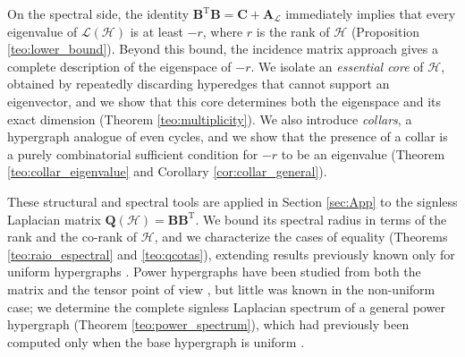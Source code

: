 \documentclass[12pt,reqno]{amsart}
\begin{document}
On the spectral side, the identity $\mathbf{B}^\mathrm{T}\mathbf{B} = \mathbf{C} + \mathbf{A}_{\mathcal{L}}$ immediately implies that every eigenvalue of $\mathcal{L}(\mathcal{H})$ is at least $-r$, where $r$ is the rank of $\mathcal{H}$ (Proposition \ref{teo:lower_bound}). Beyond this bound, the incidence matrix approach gives a complete description of the eigenspace of $-r$. We isolate an \textit{essential core} of $\mathcal{H}$, obtained by repeatedly discarding hyperedges that cannot support an eigenvector, and we show that this core determines both the eigenspace and its exact dimension (Theorem \ref{teo:multiplicity}). We also introduce \textit{collars}, a hypergraph analogue of even cycles, and we show that the presence of a collar is a purely combinatorial sufficient condition for $-r$ to be an eigenvalue (Theorem \ref{teo:collar_eigenvalue} and Corollary \ref{cor:collar_general}).

These structural and spectral tools are applied in Section \ref{sec:App} to the signless Laplacian matrix $\mathbf{Q}(\mathcal{H}) = \mathbf{B}\mathbf{B}^\mathrm{T}$. We bound its spectral radius in terms of the rank and the co-rank of $\mathcal{H}$, and we characterize the cases of equality (Theorems \ref{teo:raio_espectral} and \ref{teo:qcotas}), extending results previously known only for uniform hypergraphs \cite{kaue-sign-vector, kaue-lap}. Power hypergraphs have been studied from both the matrix and the tensor point of view \cite{Kaue-power,Khan,Lucas-integral}, but little was known in the non-uniform case; we determine the complete signless Laplacian spectrum of a general power hypergraph (Theorem \ref{teo:power_spectrum}), which had previously been computed only when the base hypergraph is uniform \cite{kaue-lap}.
\end{document}
